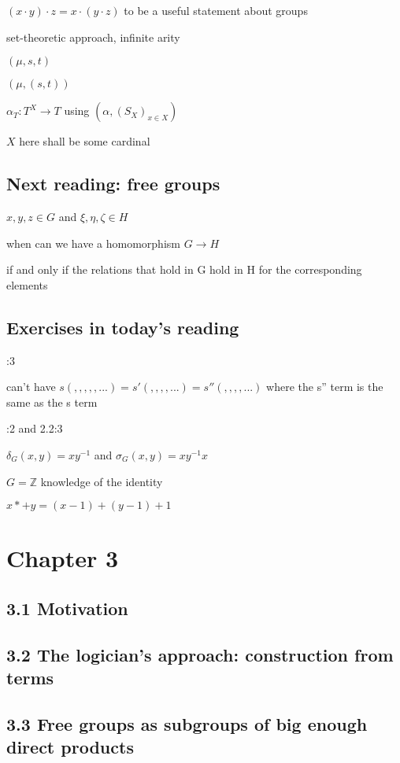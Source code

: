 \documentclass[12pt]{article}
\begin{document}
$(x \cdot y) \cdot z = x \cdot (y \cdot z)$ to be a useful statement about groups

\noindent
set-theoretic approach, infinite arity

$(\mu, s, t)$

$(\mu, (s, t))$

$\alpha_T: T^X \to T$ using $(\alpha, (S_X)_{x \in X})$

$X$ here shall be some cardinal

\subsection{Next reading: free groups}

\noindent
$x, y, z \in G$ and $\xi, \eta, \zeta \in H$

when can we have a homomorphism $G \to H$

if and only if the relations that hold in G hold in H for the corresponding elements

\subsection{Exercises in today's reading}

:3

can't have $s( , , , , ,...) = s'( , , , , ...) = s''( , , , , ...)$ where the s'' term is the same as the s term

:2 and 2.2:3

$\delta_G(x, y) = xy^{-1}$ and $\sigma_G(x, y) = xy^{-1}x$

$G = \mathds{Z}$ knowledge of the identity

$x *+ y = (x - 1) + (y - 1) + 1$

\section{Chapter 3}

\subsection{3.1 Motivation}



\subsection{3.2 The logician's approach: construction from terms}

\subsection{3.3 Free groups as subgroups of big enough direct products}
\end{document}

